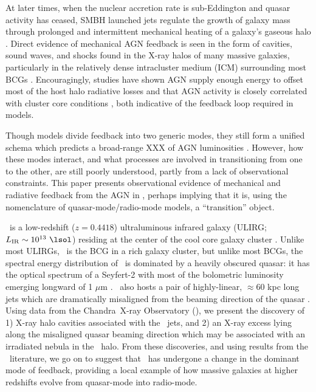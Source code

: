 \documentclass[useAMS,usenatbib]{mn2e}
\begin{document}
At later times, when the nuclear accretion rate is sub-Eddington and
quasar activity has ceased, SMBH launched jets regulate the growth of
galaxy mass through prolonged and intermittent mechanical heating of a
galaxy's gaseous halo \citep[\eg][]{2005MNRAS.363....2K,
  2006MNRAS.368....2D}. Direct evidence of mechanical AGN feedback is
seen in the form of cavities, sound waves, and shocks found in the
X-ray halos of many massive galaxies, particularly in the relatively
dense intracluster medium (ICM) surrounding most BCGs
\citep[\eg][]{perseus1, hydraa0, 2001ApJ...554..261C,
  2007ApJ...665.1057F, 2008MNRAS.390L..93S}. Encouragingly, studies
have shown AGN supply enough energy to offset most of the host halo
radiative losses \citep[\eg][]{perseus2, birzan04, dunn06} and that
AGN activity is closely correlated with cluster core conditions
\citep[\eg][]{haradent, rafferty08}, both indicative of the feedback
loop required in models.

Though models divide feedback into two generic modes, they still form
a unified schema \citep[\eg][]{sijacki07} which predicts a broad-range
XXX of AGN luminosities \citep[\eg][]{2009ApJ...698.1550H}. However, how
these modes interact, and what processes are involved in transitioning
from one to the other, are still poorly understood, partly from a lack
of observational constraints. This paper presents observational
evidence of mechanical and radiative feedback from the AGN in \irs,
perhaps implying that it is, using the nomenclature of
quasar-mode/radio-mode models, a ``transition'' object.

\irs\ is a low-redshift ($z = 0.4418$) ultraluminous infrared galaxy
(ULIRG; $L_{\rm{IR}} \sim 10^{13} ~\lsol$) residing at the center of
the cool core galaxy cluster \rxj. Unlike most ULIRGs, \irs\ is the
BCG in a rich galaxy cluster, but unlike most BCGs, the spectral
energy distribution of \irs\ is dominated by a heavily obscured
quasar: it has the optical spectrum of a Seyfert-2 with most of the
bolometric luminosity emerging longward of 1 $\mu$m
\citep{1988ApJ...328..161K, 1993ApJ...415...82H, 1994ApJ...436L..51F,
  1998ApJ...506..205E, 2000A&A...353..910F,
  2001MNRAS.321L..15I}. \irs\ also hosts a pair of highly-linear,
$\approx 60$ kpc long jets which are dramatically misaligned from the
beaming direction of the quasar \citep[][hereafter H93 and H99,
  respectively]{1993ApJ...415...82H, 1999ApJ...512..145H}. Using data
from the Chandra\ X-ray Observatory (\cxo), we present the discovery
of 1) X-ray halo cavities associated with the \irs\ jets, and 2) an
X-ray excess lying along the misaligned quasar beaming direction which
may be associated with an irradiated nebula in the \irs\ halo. From
these discoveries, and using results from the \irs\ literature, we go
on to suggest that \irs\ has undergone a change in the dominant mode
of feedback, providing a local example of how massive galaxies at
higher redshifts evolve from quasar-mode into radio-mode.
\end{document}
